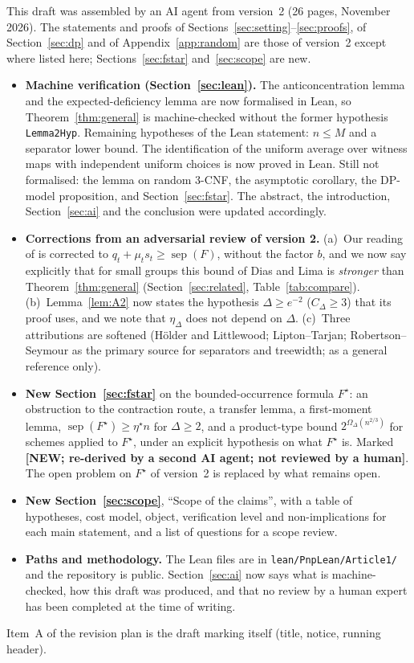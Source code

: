 \documentclass[11pt,a4paper]{article}
\newcommand{\NEWR}{\textbf{[NEW; re-derived by a second AI agent; not reviewed by a human]}}
\theoremstyle{definition}
\theoremstyle{remark}
\newcommand{\sep}{\operatorname{sep}}
\begin{document}
This draft was assembled by an AI agent from version~2 (26 pages, November 2026). The
statements and proofs of Sections~\ref{sec:setting}--\ref{sec:proofs}, of
Section~\ref{sec:dp} and of Appendix~\ref{app:random} are those of version~2 except where
listed here; Sections~\ref{sec:fstar} and~\ref{sec:scope} are new.
\begin{itemize}
\item[\textbf{B.}] \textbf{Machine verification (Section~\ref{sec:lean}).} The
 anticoncentration lemma and the expected-deficiency lemma are now formalised in Lean, so
 Theorem~\ref{thm:general} is machine-checked without the former hypothesis
 \texttt{Lemma2Hyp}. Remaining hypotheses of the Lean statement: $n\le M$ and a separator
 lower bound. The identification of the uniform average over witness maps with independent
 uniform choices is now proved in Lean. Still not formalised: the lemma on random 3-CNF, the
 asymptotic corollary, the DP-model proposition, and Section~\ref{sec:fstar}. The abstract,
 the introduction, Section~\ref{sec:ai} and the conclusion were updated accordingly.
\item[\textbf{C.}] \textbf{Corrections from an adversarial review of version 2.}
 (a)~Our reading of \cite[Theorem~7.1(ii)]{DL} is corrected to
 $q_t+\mu_ts_t\ge\sep(F)$, without the factor $b$, and we now say explicitly that for small
 groups this bound of Dias and Lima is \emph{stronger} than Theorem~\ref{thm:general}
 (Section~\ref{sec:related}, Table~\ref{tab:compare}).
 (b)~Lemma~\ref{lem:A2} now states the hypothesis $\Delta\ge e^{-2}$ ($C_\Delta\ge3$) that
 its proof uses, and we note that $\eta_\Delta$ does not depend on $\Delta$.
 (c)~Three attributions are softened (Hölder and Littlewood; Lipton--Tarjan;
 Robertson--Seymour as the primary source for separators and treewidth; \cite{GLR82} as a
 general reference only).
\item[\textbf{D.}] \textbf{New Section~\ref{sec:fstar}} on the bounded-occurrence formula
 $F^\star$: an obstruction to the contraction route, a transfer lemma, a first-moment lemma,
 $\sep(F^\star)\ge\eta^\star n$ for $\Delta\ge2$, and a product-type bound
 $2^{\Omega_\Delta(n^{2/3})}$ for schemes applied to $F^\star$, under an explicit hypothesis
 on what $F^\star$ is. Marked \NEWR. The open problem on $F^\star$ of version~2 is replaced
 by what remains open.
\item[\textbf{E.}] \textbf{New Section~\ref{sec:scope}}, ``Scope of the claims'', with a
 table of hypotheses, cost model, object, verification level and non-implications for each
 main statement, and a list of questions for a scope review.
\item[\textbf{F.}] \textbf{Paths and methodology.} The Lean files are in
 \texttt{lean/PnpLean/Article1/} and the repository is public. Section~\ref{sec:ai} now
 says what is machine-checked, how this draft was produced, and that no review by a human
 expert has been completed at the time of writing.
\end{itemize}
Item~A of the revision plan is the draft marking itself (title, notice, running header).
\end{document}
